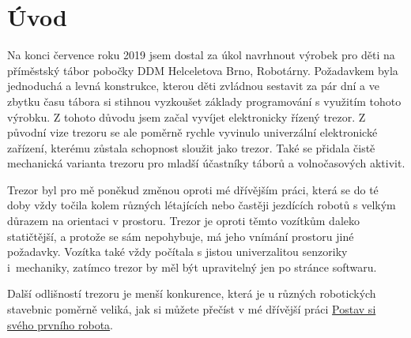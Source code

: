 \chapter*{Úvod}

Na konci července roku 2019 jsem dostal za úkol navrhnout výrobek pro děti na příměstský tábor pobočky DDM Helceletova Brno, Robotárny. %
 Poža\-dav\-kem 
byla jednoduchá a levná konstrukce, kterou děti zvládnou sestavit za pár dní a ve zbytku času tábora si stihnou vyzkoušet základy programování 
s využitím tohoto výrobku. Z tohoto důvodu jsem začal vyvíjet elektronicky řízený trezor. Z původní vize trezoru se ale poměrně rychle vyvinulo
univerzální elektronické zařízení, kterému zůstala schopnost sloužit jako trezor. Také se přidala čistě mechanická varianta trezoru pro mladší účastníky táborů a volnočasových aktivit.

Trezor byl pro mě poněkud změnou oproti mé dřívějším práci, která se do té doby vždy točila kolem různých létajících nebo častěji jezdících robotů s velkým důrazem na orientaci v prostoru.
Trezor je oproti těmto vozítkům daleko statičtější, a protože se sám nepohybuje, má jeho vnímání prostoru jiné požadavky. Vozítka také vždy počítala s jistou univerzalitou senzoriky i~mechaniky,
zatímco trezor by měl být upravitelný jen po stránce softwaru. 

Další odlišností trezoru je menší konkurence, která je u různých robotických stavebnic poměrně veliká, jak si můžete přečíst 
v mé dřívější práci \href{https://github.com/TVavrinec/SOC-text/blob/master/SOČ.pdf}{Postav si svého prvního robota}.





\newpage
